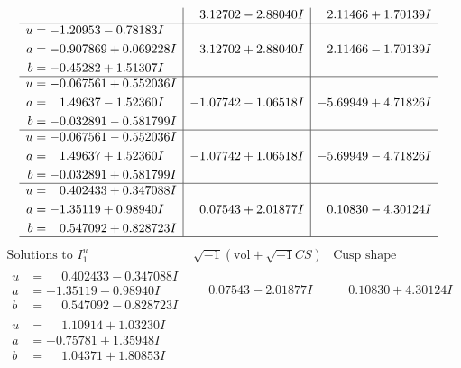 \documentclass[1p]{elsarticle_modified}
\theoremstyle{definition}
\newcommand{\I}{\sqrt{-1}}
\begin{document}
$$\begin{array}{c|c|c}
 & \phantom{-}3.12702 - 2.88040 I & \phantom{-}2.11466 + 1.70139 I \\ \hline\begin{aligned}
u &= -1.20953 - 0.78183 I \\
a &= -0.907869 + 0.069228 I \\
b &= -0.45282 + 1.51307 I\end{aligned}
 & \phantom{-}3.12702 + 2.88040 I & \phantom{-}2.11466 - 1.70139 I \\ \hline\begin{aligned}
u &= -0.067561 + 0.552036 I \\
a &= \phantom{-}1.49637 - 1.52360 I \\
b &= -0.032891 - 0.581799 I\end{aligned}
 & -1.07742 - 1.06518 I & -5.69949 + 4.71826 I \\ \hline\begin{aligned}
u &= -0.067561 - 0.552036 I \\
a &= \phantom{-}1.49637 + 1.52360 I \\
b &= -0.032891 + 0.581799 I\end{aligned}
 & -1.07742 + 1.06518 I & -5.69949 - 4.71826 I \\ \hline\begin{aligned}
u &= \phantom{-}0.402433 + 0.347088 I \\
a &= -1.35119 + 0.98940 I \\
b &= \phantom{-}0.547092 + 0.828723 I\end{aligned}
 & \phantom{-}0.07543 + 2.01877 I & \phantom{-}0.10830 - 4.30124 I\\
 \hline 
 \end{array}$$\newpage$$\begin{array}{c|c|c}  
\text{Solutions to }I^u_{1}& \I (\text{vol} + \sqrt{-1}CS) & \text{Cusp shape}\\
 \hline 
\begin{aligned}
u &= \phantom{-}0.402433 - 0.347088 I \\
a &= -1.35119 - 0.98940 I \\
b &= \phantom{-}0.547092 - 0.828723 I\end{aligned}
 & \phantom{-}0.07543 - 2.01877 I & \phantom{-}0.10830 + 4.30124 I \\ \hline\begin{aligned}
u &= \phantom{-}1.10914 + 1.03230 I \\
a &= -0.75781 + 1.35948 I \\
b &= \phantom{-}1.04371 + 1.80853 I\end{aligned}

\end{array}$$
\end{document}
